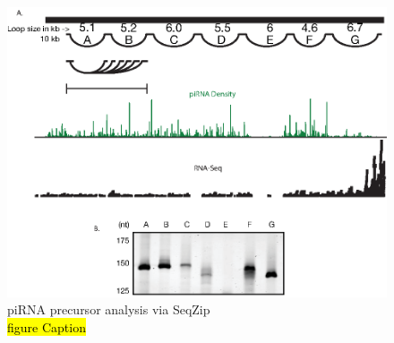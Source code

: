   \begin{figure}[htbp] %
    \centering 
    \includegraphics{Figures/Chapter2/piRNAPrecurserAnalyisBySeqZip.eps}
    \caption[piRNA precursor analysis via SeqZip]
    {
      piRNA precursor analysis via SeqZip\\
      \hl{figure Caption}
    	}
    \label{fig:Hiv tx via SeqZip}
  	\end{figure}



